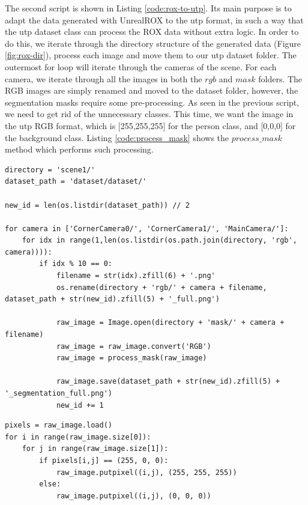 The second script is shown in Listing \ref{code:rox-to-utp}. Its main purpose is to adapt the data generated with UnrealROX to the \gls{utp} format, in such a way that the \gls{utp} dataset class can process the ROX data without extra logic. In order to do this, we iterate through the directory structure of the generated data (Figure \ref{fig:rox-dir}), process each image and move them to our \gls{utp} dataset folder. The outermost for loop will iterate through the cameras of the scene. For each camera, we iterate through all the images in both the $rgb$ and $mask$ folders. The RGB images are simply renamed and moved to the dataset folder, however, the segmentation masks require some pre-processing. As seen in the previous script, we need to get rid of the unnecessary classes. This time, we want the image in the \gls{utp} RGB format, which is [255,255,255] for the person class, and [0,0,0] for the background class. Listing \ref{code:process_mask} shows the $process\_mask$ method which performs such processing.

\begin{lstlisting}[style=Python-color, caption=UnrealROX data to UTP format, frame=single, label=code:rox-to-utp]
directory = 'scene1/'
dataset_path = 'dataset/dataset/'

new_id = len(os.listdir(dataset_path)) // 2

for camera in ['CornerCamera0/', 'CornerCamera1/', 'MainCamera/']:
	for idx in range(1,len(os.listdir(os.path.join(directory, 'rgb', camera)))):
		if idx % 10 == 0:
			filename = str(idx).zfill(6) + '.png'
			os.rename(directory + 'rgb/' + camera + filename, dataset_path + str(new_id).zfill(5) + '_full.png')
			
			raw_image = Image.open(directory + 'mask/' + camera + filename)
			raw_image = raw_image.convert('RGB')	
			raw_image = process_mask(raw_image)

			raw_image.save(dataset_path + str(new_id).zfill(5) + '_segmentation_full.png')
			new_id += 1

\end{lstlisting}

\begin{lstlisting}[style=Python-color, caption=process\_mask method whithin the script, frame=single, label=code:process_mask]
pixels = raw_image.load()
for i in range(raw_image.size[0]):
	for j in range(raw_image.size[1]):
		if pixels[i,j] == (255, 0, 0):
			raw_image.putpixel((i,j), (255, 255, 255))
		else:
			raw_image.putpixel((i,j), (0, 0, 0))

\end{lstlisting}


